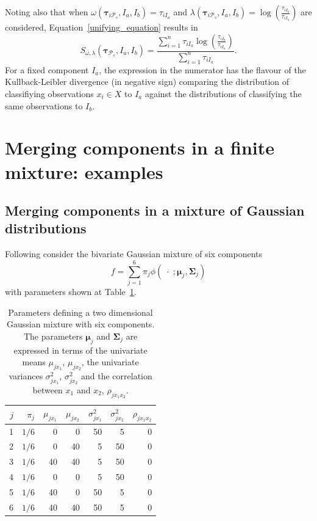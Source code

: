 \documentclass[submit]{smj}
\theoremstyle{definition}
\newcommand{\m}[1]{\boldsymbol{#1}}
\begin{document}
Noting also that when $\omega(\m\tau_{i \mathcal{P}_s},  I_a,  I_b) =  \tau_{iI_a}$ and $\lambda(\m\tau_{i \mathcal{P}_s},  I_a,  I_b) = \log \left(\frac{ \tau_{iI_b} }{ \tau_{iI_a} }\right)$ are considered, Equation~\ref{unifying_equation} results in
\[
S_{\omega, \lambda}( \m\tau_{\mathcal{P}_s},  I_a,  I_b) = \frac{\sum_{i=1}^n\tau_{iI_a}  \log \left(\frac{ \tau_{iI_b} }{ \tau_{iI_a} }\right)}{\sum_{i=1}^n \tau_{iI_a}}.
\]
For a fixed component $I_a$, the expression in the numerator has the flavour of the Kullback-Leibler divergence (in negative sign) comparing the distribution of classifiying observations $x_i \in X$ to $I_a$ against the distributions of classifying the same observations to $I_b$.

\section{Merging components in a finite mixture: examples}\label{merging_examples_dist}

\subsection{Merging components in a mixture of Gaussian distributions}

Following \cite{baudry2010combining} consider the bivariate Gaussian mixture of six components
\[
f= \sum_{j=1}^6 \pi_j \phi(\;\cdot\; ;  \m\mu_j, \m\Sigma_j)
\]
with parameters shown at Table~\ref{pars_table}. 

\begin{table}[t]
\centering
\begin{tabular}{rrrrrrr}
  \hline
$j$ & $\pi_j$ & $\mu_{j x_1}$ & $\mu_{j x_2}$ & $\sigma^2_{j x_1}$ & $\sigma^2_{j x_2}$ & $\rho_{j x_1 x_2}$ \\ 
  \hline
  1 &  $1/6$ &     0 &     0 &    50 &     5 &     0 \\ 
  2 &  $1/6$  &     0 &    40 &     5 &    50 &     0 \\ 
  3 &  $1/6$  &    40 &    40 &     5 &    50 &     0 \\ 
  4 &  $1/6$  &     0 &     0 &     5 &    50 &     0 \\ 
  5 &  $1/6$  &    40 &     0 &    50 &     5 &     0 \\ 
  6 &  $1/6$  &    40 &    40 &    50 &     5 &     0 \\ 
   \hline
\end{tabular}
\caption{Parameters defining a two dimensional Gaussian mixture with six components. The parameters $\m\mu_j$ and $\m\Sigma_j$ are expressed in terms of the univariate means $\mu_{j x_1}$, $\mu_{j x_2}$, the univariate variances $\sigma^2_{j x_1}$, $\sigma^2_{j x_2}$ and the correlation between $x_1$ and $x_2$, $\rho_{j x_1 x_2}$.}
\label{pars_table}
\end{table}
\end{document}
